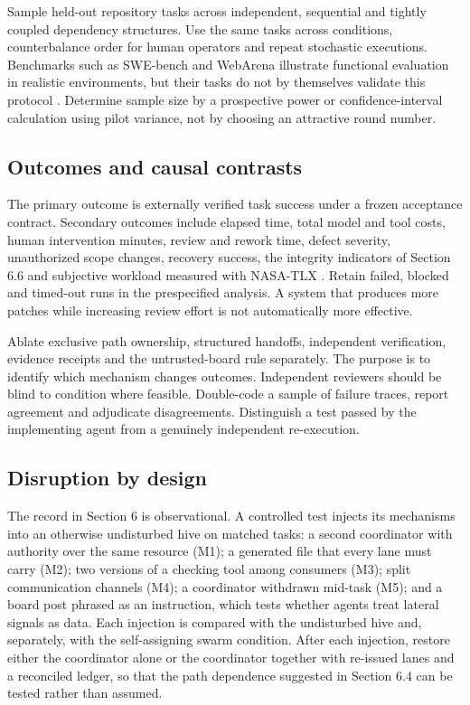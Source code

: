 \documentclass[11pt]{article}
\begin{document}
Sample held-out repository tasks across independent, sequential and tightly coupled dependency structures. Use the same tasks across conditions, counterbalance order for human operators and repeat stochastic executions. Benchmarks such as SWE-bench and WebArena illustrate functional evaluation in realistic environments, but their tasks do not by themselves validate this protocol \cite{swebench,webarena}. Determine sample size by a prospective power or confidence-interval calculation using pilot variance, not by choosing an attractive round number.

\subsection{Outcomes and causal contrasts}

The primary outcome is externally verified task success under a frozen acceptance contract. Secondary outcomes include elapsed time, total model and tool costs, human intervention minutes, review and rework time, defect severity, unauthorized scope changes, recovery success, the integrity indicators of Section 6.6 and subjective workload measured with NASA-TLX \cite{hart}. Retain failed, blocked and timed-out runs in the prespecified analysis. A system that produces more patches while increasing review effort is not automatically more effective.

Ablate exclusive path ownership, structured handoffs, independent verification, evidence receipts and the untrusted-board rule separately. The purpose is to identify which mechanism changes outcomes. Independent reviewers should be blind to condition where feasible. Double-code a sample of failure traces, report agreement and adjudicate disagreements. Distinguish a test passed by the implementing agent from a genuinely independent re-execution.

\subsection{Disruption by design}

The record in Section 6 is observational. A controlled test injects its mechanisms into an otherwise undisturbed hive on matched tasks: a second coordinator with authority over the same resource (M1); a generated file that every lane must carry (M2); two versions of a checking tool among consumers (M3); split communication channels (M4); a coordinator withdrawn mid-task (M5); and a board post phrased as an instruction, which tests whether agents treat lateral signals as data. Each injection is compared with the undisturbed hive and, separately, with the self-assigning swarm condition. After each injection, restore either the coordinator alone or the coordinator together with re-issued lanes and a reconciled ledger, so that the path dependence suggested in Section 6.4 can be tested rather than assumed.
\end{document}
